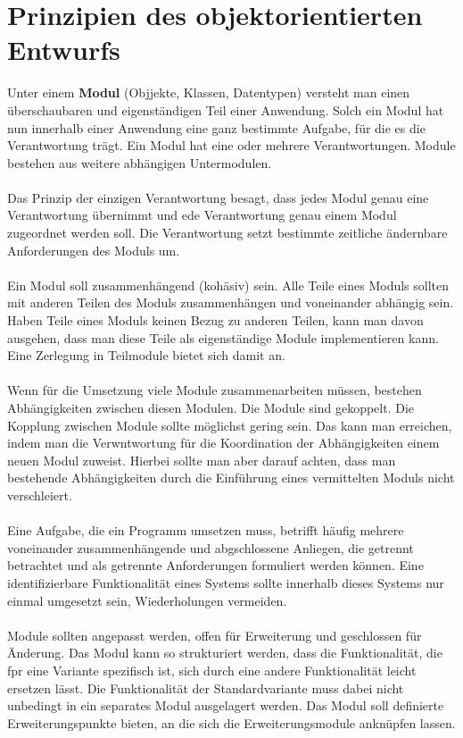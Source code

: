 \section{Prinzipien des objektorientierten Entwurfs}
Unter einem \textbf{Modul} (Objjekte, Klassen, Datentypen) versteht man einen überschaubaren und eigenständigen Teil einer Anwendung. Solch ein Modul hat nun innerhalb einer Anwendung eine ganz bestimmte Aufgabe, für die es die Verantwortung trägt. Ein Modul hat eine oder mehrere Verantwortungen. Module bestehen aus weitere abhängigen Untermodulen. 
\\\\
Das Prinzip der einzigen Verantwortung besagt, dass jedes Modul genau eine Verantwortung übernimmt und ede Verantwortung genau einem Modul zugeordnet werden soll. Die Verantwortung setzt bestimmte zeitliche ändernbare Anforderungen des Moduls um.
\\\\
Ein Modul soll zusammenhängend (kohäsiv) sein. Alle Teile eines Moduls sollten mit anderen Teilen des Moduls zusammenhängen und voneinander abhängig sein. Haben Teile eines Moduls keinen Bezug zu anderen Teilen, kann man davon ausgehen, dass man diese Teile als eigenständige Module implementieren kann. Eine Zerlegung in Teilmodule bietet sich damit an.
\\\\
Wenn für die Umsetzung viele Module zusammenarbeiten müssen, bestehen Abhängigkeiten zwischen diesen Modulen. Die Module sind gekoppelt. Die Kopplung zwischen Module sollte möglichst gering sein. Das kann man erreichen, indem man die Verwntwortung für die Koordination der Abhängigkeiten einem neuen Modul zuweist. Hierbei sollte man aber darauf achten, dass man bestehende Abhängigkeiten durch die Einführung eines vermittelten Moduls nicht verschleiert.
\\\\
Eine Aufgabe, die ein Programm umsetzen muss, betrifft häufig mehrere voneinander zusammenhängende und abgschlossene Anliegen, die getrennt betrachtet und als getrennte Anforderungen formuliert werden können. Eine identifizierbare Funktionalität eines Systems sollte innerhalb dieses Systems nur einmal umgesetzt sein, Wiederholungen vermeiden.
\\\\
Module sollten angepasst werden, offen für Erweiterung und geschlossen für Änderung. Das Modul kann so strukturiert werden, dass die Funktionalität, die fpr eine Variante spezifisch ist, sich durch eine andere Funktionalität leicht ersetzen lässt. Die Funktionalität der Standardvariante muss dabei nicht unbedingt in ein separates Modul ausgelagert werden. Das Modul soll definierte Erweiterungspunkte bieten, an die sich die Erweiterungsmodule anknüpfen lassen.
